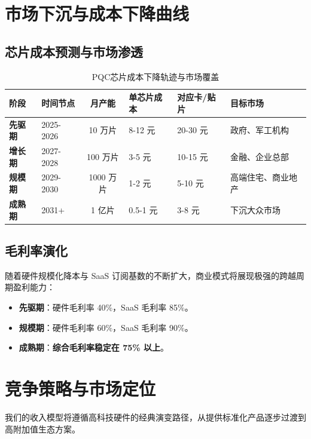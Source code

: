 \section{市场下沉与成本下降曲线}

\subsection{芯片成本预测与市场渗透}

\begin{table}[H]
	\centering
	\caption{PQC芯片成本下降轨迹与市场覆盖}
	\label{tab:chip_cost}
	\renewcommand{\arraystretch}{1.3}
	\begin{tabular}{p{1.5cm}p{2cm}cp{2cm}p{2cm}p{3.5cm}}
		\toprule
		\textbf{阶段} & \textbf{时间节点} & \textbf{月产能} & \textbf{单芯片成本} & \textbf{对应卡/贴片} & \textbf{目标市场} \\
		\midrule
		\textbf{先驱期} & 2025-2026 & 10 万片 & 8-12 元 & 20-30 元 & 政府、军工机构 \\
		\textbf{增长期} & 2027-2028 & 100 万片 & 3-5 元 & 10-15 元 & 金融、企业总部 \\
		\textbf{规模期} & 2029-2030 & 1000 万片 & 1-2 元 & 5-10 元 & 高端住宅、商业地产 \\
		\textbf{成熟期} & 2031+ & 1 亿片 & 0.5-1 元 & 3-8 元 & 下沉大众市场 \\
		\bottomrule
	\end{tabular}
\end{table}

\subsection{毛利率演化}
随着硬件规模化降本与 SaaS 订阅基数的不断扩大，商业模式将展现极强的跨越周期盈利能力：
\begin{itemize}
	\item \textbf{先驱期}：硬件毛利率 40\%，SaaS 毛利率 85\%。
	\item \textbf{规模期}：硬件毛利率 60\%，SaaS 毛利率 90\%。
	\item \textbf{成熟期}：\textbf{综合毛利率稳定在 75\% 以上}。
\end{itemize}

\section{竞争策略与市场定位}

我们的收入模型将遵循高科技硬件的经典演变路径，从提供标准化产品逐步过渡到高附加值生态方案。

